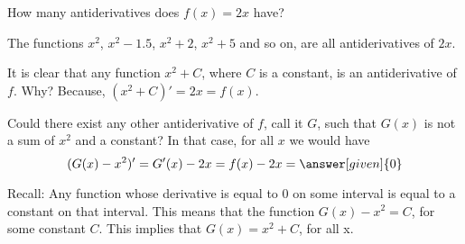 \documentclass{ximera}
\begin{document}
\begin{question}
  How many antiderivatives does $f(x) = 2x$ have?
  \begin{prompt}
  \begin{multipleChoice}
  \end{multipleChoice}
  \end{prompt}
  \begin{feedback}
   \begin{image}
\end{image}
    The functions $x^2$, $x^2-1.5$, $x^2+2$, $x^2+5$ and so on, are all
    antiderivatives of $2x$.
    
     It is clear that any function $x^2+C$, where $C$ is a constant, is an antiderivative of $f$. Why?
    Because, $(x^2+C)'=2x=f(x)$.
    
     Could there exist any other antiderivative of $f$, call it $G$, such that $G(x)$ is not a sum of $x^2$ and a constant?
    In that case, for all $x$  we would have
  \[
  (G(x)-x^2)' = G'(x)-2x=f(x)-2x= \answer[given]{0}\\
\]
  \end{feedback}
  Recall: Any function whose derivative is equal to $0$ on some interval is equal to a constant on that interval.
  This means that the function $G(x)-x^2=C$, for some constant $C$. This implies that $G(x)=x^2+C$, for all x.
\end{question}
\end{document}
